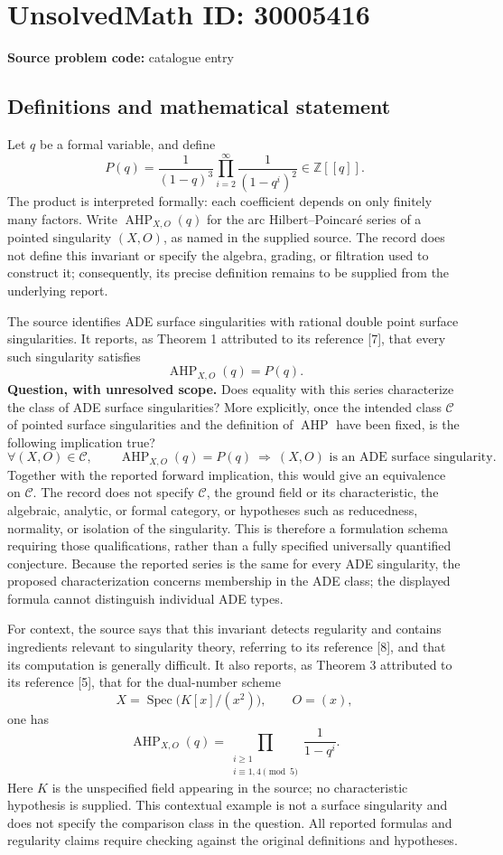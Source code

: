 \documentclass[11pt]{article}
\newcommand{\Z}{\mathbb{Z}}
\begin{document}
\section*{UnsolvedMath ID: 30005416}
\textbf{Source problem code:} catalogue entry
\subsection{Definitions and mathematical statement}
Let \(q\) be a formal variable, and define
\[
P(q)=\frac{1}{(1-q)^3}\prod_{i=2}^{\infty}\frac{1}{(1-q^i)^2}\in\Z[[q]].
\]
The product is interpreted formally: each coefficient depends on only finitely many factors. Write \(\operatorname{AHP}_{X,O}(q)\) for the arc Hilbert--Poincar\'e series of a pointed singularity \((X,O)\), as named in the supplied source. The record does not define this invariant or specify the algebra, grading, or filtration used to construct it; consequently, its precise definition remains to be supplied from the underlying report.

The source identifies ADE surface singularities with rational double point surface singularities. It reports, as Theorem 1 attributed to its reference [7], that every such singularity satisfies
\[
\operatorname{AHP}_{X,O}(q)=P(q).
\]
\textbf{Question, with unresolved scope.} Does equality with this series characterize the class of ADE surface singularities? More explicitly, once the intended class \(\mathcal C\) of pointed surface singularities and the definition of \(\operatorname{AHP}\) have been fixed, is the following implication true?
\[
\forall (X,O)\in\mathcal C,\qquad
\operatorname{AHP}_{X,O}(q)=P(q)
\ \Longrightarrow\
(X,O)\text{ is an ADE surface singularity}.
\]
Together with the reported forward implication, this would give an equivalence on \(\mathcal C\). The record does not specify \(\mathcal C\), the ground field or its characteristic, the algebraic, analytic, or formal category, or hypotheses such as reducedness, normality, or isolation of the singularity. This is therefore a formulation schema requiring those qualifications, rather than a fully specified universally quantified conjecture. Because the reported series is the same for every ADE singularity, the proposed characterization concerns membership in the ADE class; the displayed formula cannot distinguish individual ADE types.

For context, the source says that this invariant detects regularity and contains ingredients relevant to singularity theory, referring to its reference [8], and that its computation is generally difficult. It also reports, as Theorem 3 attributed to its reference [5], that for the dual-number scheme
\[
X=\operatorname{Spec}\bigl(K[x]/(x^2)\bigr),\qquad O=(x),
\]
one has
\[
\operatorname{AHP}_{X,O}(q)
=\prod_{\substack{i\geq 1\\ i\equiv 1,4\pmod 5}}\frac{1}{1-q^i}.
\]
Here \(K\) is the unspecified field appearing in the source; no characteristic hypothesis is supplied. This contextual example is not a surface singularity and does not specify the comparison class in the question. All reported formulas and regularity claims require checking against the original definitions and hypotheses.
\end{document}
